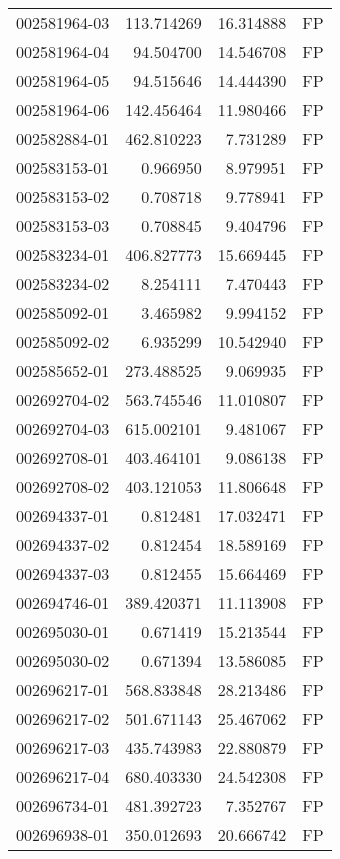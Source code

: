 \begin{tabular}{lrrl}
002581964-03 &  113.714269 &    16.314888 &   FP \\
002581964-04 &   94.504700 &    14.546708 &   FP \\
002581964-05 &   94.515646 &    14.444390 &   FP \\
002581964-06 &  142.456464 &    11.980466 &   FP \\
002582884-01 &  462.810223 &     7.731289 &   FP \\
002583153-01 &    0.966950 &     8.979951 &   FP \\
002583153-02 &    0.708718 &     9.778941 &   FP \\
002583153-03 &    0.708845 &     9.404796 &   FP \\
002583234-01 &  406.827773 &    15.669445 &   FP \\
002583234-02 &    8.254111 &     7.470443 &   FP \\
002585092-01 &    3.465982 &     9.994152 &   FP \\
002585092-02 &    6.935299 &    10.542940 &   FP \\
002585652-01 &  273.488525 &     9.069935 &   FP \\
002692704-02 &  563.745546 &    11.010807 &   FP \\
002692704-03 &  615.002101 &     9.481067 &   FP \\
002692708-01 &  403.464101 &     9.086138 &   FP \\
002692708-02 &  403.121053 &    11.806648 &   FP \\
002694337-01 &    0.812481 &    17.032471 &   FP \\
002694337-02 &    0.812454 &    18.589169 &   FP \\
002694337-03 &    0.812455 &    15.664469 &   FP \\
002694746-01 &  389.420371 &    11.113908 &   FP \\
002695030-01 &    0.671419 &    15.213544 &   FP \\
002695030-02 &    0.671394 &    13.586085 &   FP \\
002696217-01 &  568.833848 &    28.213486 &   FP \\
002696217-02 &  501.671143 &    25.467062 &   FP \\
002696217-03 &  435.743983 &    22.880879 &   FP \\
002696217-04 &  680.403330 &    24.542308 &   FP \\
002696734-01 &  481.392723 &     7.352767 &   FP \\
002696938-01 &  350.012693 &    20.666742 &   FP \\

\end{tabular}
